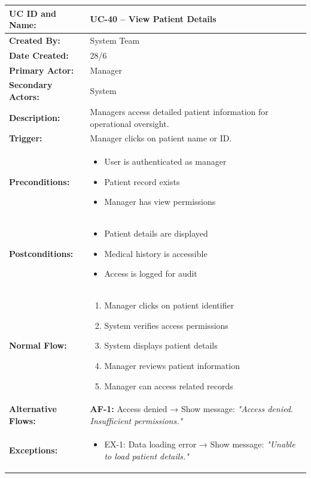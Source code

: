 \documentclass[12pt,a4paper]{article}
\begin{document}
\renewcommand{\arraystretch}{1.5}
\begin{longtable}{|p{4.5cm}|p{10.5cm}|}
\hline
\textbf{UC ID and Name:} & UC-40 – View Patient Details \\
\hline
\textbf{Created By:} & System Team \\
\hline
\textbf{Date Created:} & 28/6 \\
\hline
\textbf{Primary Actor:} & Manager \\
\hline
\textbf{Secondary Actors:} & System \\
\hline
\textbf{Description:} & Managers access detailed patient information for operational oversight. \\
\hline
\textbf{Trigger:} & Manager clicks on patient name or ID. \\
\hline
\textbf{Preconditions:} &
\begin{itemize}
  \item User is authenticated as manager
  \item Patient record exists
  \item Manager has view permissions
\end{itemize} \\
\hline
\textbf{Postconditions:} &
\begin{itemize}
  \item Patient details are displayed
  \item Medical history is accessible
  \item Access is logged for audit
\end{itemize} \\
\hline
\textbf{Normal Flow:} &
\begin{enumerate}
  \item Manager clicks on patient identifier
  \item System verifies access permissions
  \item System displays patient details
  \item Manager reviews patient information
  \item Manager can access related records
\end{enumerate} \\
\hline
\textbf{Alternative Flows:} &
\textbf{AF-1:} Access denied → Show message: \textit{"Access denied. Insufficient permissions."} \\
\hline
\textbf{Exceptions:} &
\begin{itemize}
  \item EX-1: Data loading error → Show message: \textit{"Unable to load patient details."}

\end{itemize}
\end{longtable}
\end{document}
